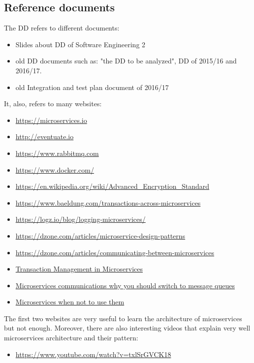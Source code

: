 \subsection{Reference documents}
The DD refers to different documents:
\begin{itemize}
\item Slides about DD of Software Engineering 2
\item old DD documents such as: "the DD to be analyzed", DD of 2015/16 and 2016/17.
\item old Integration and test plan document of 2016/17
\end{itemize}
It, also, refers to many websites:
\begin{itemize}
\item \url{https://microservices.io}
\item \url{http://eventuate.io}
\item \url{https://www.rabbitmq.com}
\item \url{https://www.docker.com/}
\item \url{https://en.wikipedia.org/wiki/Advanced_Encryption_Standard}
\item \url{https://www.baeldung.com/transactions-across-microservices}
\item \url{https://logz.io/blog/logging-microservices/}
\item \url{https://dzone.com/articles/microservice-design-patterns}
\item \url{https://dzone.com/articles/communicating-between-microservices}
\item \href{https://medium.com/@walkingtreetech/transaction-management-in-microservices-ab09b0cb803b}{Transaction Management in Microservices}
\item \href{https://dev.to/matteojoliveau/microservices-communications-why-you-should-switch-to-message-queues--48ia}{Microservices communications why you should switch to message queues}
\item \href{https://www.qualogy.com/techblog/it-development-and-operations/microservices-when-not-to-use-them...#}{Microservices when not to use them}
\end{itemize}
The first two websites are very useful to learn the architecture of microservices but not enough. Moreover, there are also interesting videos that explain very well microservices architecture and their pattern:
\begin{itemize}
\item \url{https://www.youtube.com/watch?v=txlSrGVCK18}
\end{itemize}


